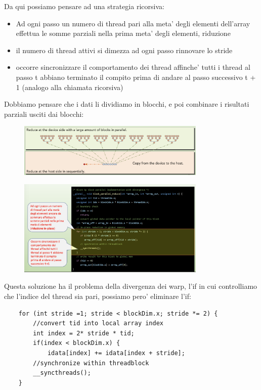 Da qui possiamo pensare ad una strategia ricorsiva:
\begin{itemize}
    \item Ad ogni passo un numero di thread pari alla meta' degli elementi dell'array effettua le somme parziali nella prima meta' degli elementi, riduzione
    \item il numero di thread attivi si dimezza ad ogni passo rinnovare lo stride
    \item occorre sincronizzare il comportamento dei thread affinche' tutti i thread al passo t abbiano terminato il compito prima di andare al passo successivo t + 1 (analogo alla chiamata ricorsiva)
\end{itemize}

Dobbiamo pensare che i dati li dividiamo in blocchi, e poi combinare i risultati parziali usciti dai blocchi:
\begin{figure}[ht!]
    \centering
    \includegraphics[width=0.8\textwidth]{images/sommeParzialiBlocchi.png}
\end{figure}


\begin{figure}[ht!]
    \centering
    \includegraphics[width=0.8\textwidth]{images/reduction.png}
\end{figure}

Questa soluzione ha il problema della divergenza dei warp, l'if in cui controlliamo che l'indice del thread sia pari, possiamo pero' eliminare l'if:
\begin{lstlisting}
    for (int stride =1; stride < blockDim.x; stride *= 2) {
        //convert tid into local array index 
        int index = 2* stride * tid;
        if(index < blockDim.x) {
            idata[index] += idata[index + stride];
        //synchronize within threadblock
        __syncthreads();
    }
\end{lstlisting}

